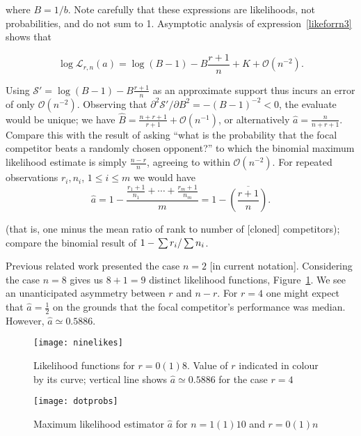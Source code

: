 \documentclass[ejs,noshowframe]{imsart}
\theoremstyle{plain}
\theoremstyle{definition}
\theoremstyle{remark}
\begin{document}
\noindent where $B=1/b$.  Note carefully that these expressions are
likelihoods, not probabilities, and do not sum to 1.  Asymptotic
analysis of expression~\ref{likeforrn3} shows that

\begin{equation}\label{asymptotic}
\log\mathcal{L}_{r,n}(a)=\log(B-1)-B\frac{r+1}{n}
+ K + \mathcal{O}\left(n^{-2}\right).
\end{equation}

Using $\mathcal{S}'=\log(B-1)-B\frac{r+1}{n}$ as an approximate support
thus incurs an error of only $\mathcal{O}(n^{-2})$.  Observing that
$\partial^2\mathcal{S'}/\partial B^2=-(B-1)^{-2}<0$, the evaluate
would be unique; we have
$\hat{B}=\frac{n+r+1}{r+1}+\mathcal{O}\left(n^{-1}\right)$, or
alternatively $\hat{a}=\frac{n}{n+r+1}$.  Compare this with the result
of asking ``what is the probability that the focal competitor
beats a randomly chosen opponent?'' to which the binomial maximum
likelihood estimate is simply $\frac{n-r}{n}$, agreeing to within
$\mathcal{O}(n^{-2})$.  For repeated observations $r_i,n_i$,
$1\leqslant i\leqslant m$ we would have
\begin{equation}
  \hat{a} = 1-
  \frac{\frac{r_1+1}{n_1}+\cdots+\frac{r_m+1}{n_m}}{m}
  = 1-\overline{\left(\frac{r+1}{n}\right)}.
\end{equation}

(that is, one minus the mean ratio of rank to number of [cloned]
competitors); compare the binomial result of $1-\left.\sum
r_i\right/\sum n_i$.

Previous related work presented the case $n=2$ [in current notation].
Considering the case $n=8$ gives us $8+1=9$ distinct likelihood
functions, Figure~\ref{ninelikes}.  We see an unanticipated asymmetry
between $r$ and $n-r$.  For $r=4$ one might expect that
$\hat{a}=\frac{1}{2}$ on the grounds that the focal competitor's
performance was median.  However, $\hat{a}\simeq 0.5886$.

\begin{figure}[t]
\texttt{[image: ninelikes]}  %
\caption{Likelihood functions for $r=0(1)8$\label{ninelikes}.  Value of $r$ indicated in colour by its curve; vertical line shows $\hat{a}\simeq 0.5886$ for the case $r=4$}
\end{figure}


\begin{figure}[t]
\texttt{[image: dotprobs]}  %
\caption{Maximum likelihood estimator $\hat{a}$ for $n=1(1)10$ and $r=0(1)n$
  \label{dotprobs}}
\end{figure}
\end{document}
